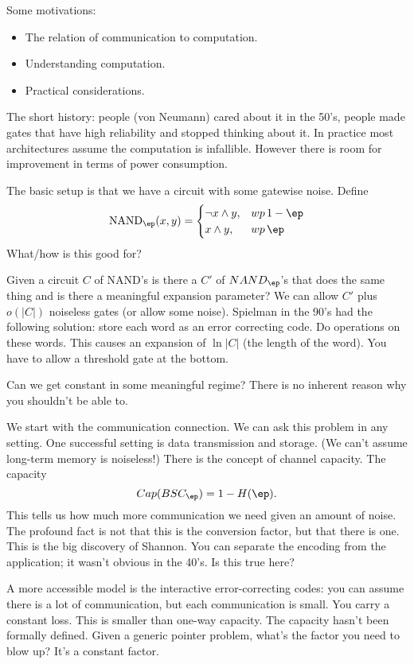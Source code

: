 Some motivations:
\begin{itemize}
\item
The relation of communication to computation.
\item
Understanding computation.
\item 
Practical considerations.
\end{itemize}

The short history: people (von Neumann) cared about it in the 50's, people made gates that have high reliability and stopped thinking about it. In practice most architectures assume the computation is infallible. However there is room for improvement in terms of power consumption.

The basic setup is that we have a circuit with some gatewise noise.
Define
\[
\text{NAND}_\ep(x,y) = \begin{cases}
\neg x \wedge y,&wp\,1-\ep\\
x \wedge y,&wp\,\ep
\end{cases}
\]
What/how is this good for?

Given a circuit $C$ of NAND's is there a $C'$ of $NAND_\ep$'s that does the same thing and is there a meaningful expansion parameter? We can allow $C'$ plus $o(|C|)$ noiseless gates (or allow some noise). Spielman in the 90's had the following solution: store each word as an error correcting code. Do operations on these words. This causes an expansion of $\ln |C|$ (the length of the word).
You have to allow a threshold gate at the bottom. 

Can we get constant in some meaningful regime? There is no inherent reason why you shouldn't be able to.

We start with the communication connection. We can ask this problem in any setting. One successful setting is data transmission and storage. (We can't assume long-term memory is noiseless!) There is the concept of channel capacity. The capacity
\[
Cap(BSC_\ep)=1-H(\ep).
\]
This tells us how much more communication we need given an amount of noise. The profound fact is not that this is the conversion factor, but that there is one. This is the big discovery of Shannon. %
You can separate the encoding from the application; it wasn't obvious in the 40's.
Is this true here?

A more accessible model is the interactive error-correcting codes: you can assume there is a lot of communication, but each communication is small. You carry a constant loss.
This is smaller than one-way capacity. The capacity hasn't been formally defined. Given a generic pointer problem, what's the factor you need to blow up? It's a constant factor.

